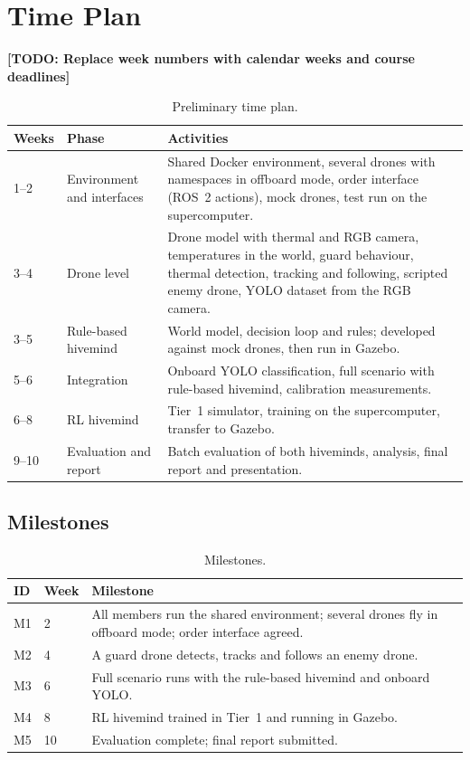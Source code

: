 \documentclass{article}
\newcommand{\todo}[1]{\textbf{[TODO: #1]}}
\begin{document}
\section{Time Plan}
\todo{Replace week numbers with calendar weeks and course deadlines}

\begin{table}[H]
\centering
\begin{tabular}{|l|l|p{8.5cm}|}
\hline
\textbf{Weeks} & \textbf{Phase} & \textbf{Activities} \\ \hline
1--2 & Environment and interfaces &
  Shared Docker environment, several drones with namespaces in offboard
  mode, order interface (ROS~2 actions), mock drones, test run on the
  supercomputer. \\ \hline
3--4 & Drone level &
  Drone model with thermal and RGB camera, temperatures in the world,
  guard behaviour, thermal detection, tracking and following, scripted
  enemy drone, YOLO dataset from the RGB camera. \\ \hline
3--5 & Rule-based hivemind &
  World model, decision loop and rules; developed against mock drones,
  then run in Gazebo. \\ \hline
5--6 & Integration &
  Onboard YOLO classification, full scenario with rule-based hivemind,
  calibration measurements. \\ \hline
6--8 & RL hivemind &
  Tier~1 simulator, training on the supercomputer, transfer to Gazebo. \\ \hline
9--10 & Evaluation and report &
  Batch evaluation of both hiveminds, analysis, final report and
  presentation. \\ \hline
\end{tabular}
\caption{Preliminary time plan.}
\end{table}

\subsection{Milestones}
\begin{table}[H]
\centering
\begin{tabular}{|l|l|p{9.5cm}|}
\hline
\textbf{ID} & \textbf{Week} & \textbf{Milestone} \\ \hline
M1 & 2  & All members run the shared environment; several drones fly in
          offboard mode; order interface agreed. \\ \hline
M2 & 4  & A guard drone detects, tracks and follows an enemy drone. \\ \hline
M3 & 6  & Full scenario runs with the rule-based hivemind and onboard YOLO. \\ \hline
M4 & 8  & RL hivemind trained in Tier~1 and running in Gazebo. \\ \hline
M5 & 10 & Evaluation complete; final report submitted. \\ \hline
\end{tabular}
\caption{Milestones.}
\end{table}
\end{document}
